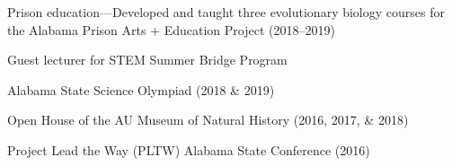 \begin{veryTightItemize}
    \item Prison education---Developed and taught three evolutionary biology
        courses for the Alabama Prison Arts + Education Project (2018--2019)
    \item Guest lecturer for STEM Summer Bridge Program
    \item Alabama State Science Olympiad (2018 \& 2019)
    \item Open House of the AU Museum of Natural History (2016, 2017, \& 2018)
    \item Project Lead the Way (PLTW) Alabama State Conference (2016)
\end{veryTightItemize}
